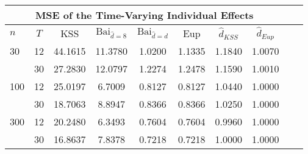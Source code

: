 \begin{tabular}{lccccccccc} 
\hline \multicolumn{8}{c}{MSE of the Time-Varying Individual Effects} \\ \hline 
$n$ & $T$ & KSS & $ \text{Bai}_{\hat{d} = 8}$ & $\text{Bai}_{\hat{d} = d}$ & Eup & $\hat{d}_{KSS}$ & $\hat{d}_{Eup}$ \\
\hline
30 & 12 &  44.1615  &  11.3780  &  1.0200  &  1.1335  &  1.1840  &  1.0070  \\
& 30 &  27.2830  &  12.0797  &  1.2274  &  1.2478  &  1.1590  &  1.0010  \\
100 & 12 &  25.0197  &  6.7009  &  0.8127  &  0.8127  &  1.0440  &  1.0000  \\
& 30 &  18.7063  &  8.8947  &  0.8366  &  0.8366  &  1.0250  &  1.0000  \\
300 & 12 &  20.2480  &  6.3493  &  0.7604  &  0.7604  &  0.9960  &  1.0000  \\
& 30 &  16.8637  &  7.8378  &  0.7218  &  0.7218  &  1.0000  &  1.0000  \\
\end{tabular} 
